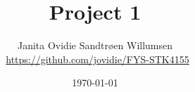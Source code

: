 \documentclass[reprint,english,notitlepage]{revtex4-1}  %
\begin{document}

% 


% 
\title{Project 1}
\author{Janita Ovidie Sandtrøen Willumsen \\ \faGithub \, \url{https://github.com/jovidie/FYS-STK4155}}        
\date{\today}
\noaffiliation

% 
\maketitle

% 

% 

% 
% 
% 
% 
% 
\newpage
% 
% 
 
\onecolumngrid
\newpage 


\newpage



\end{document}
